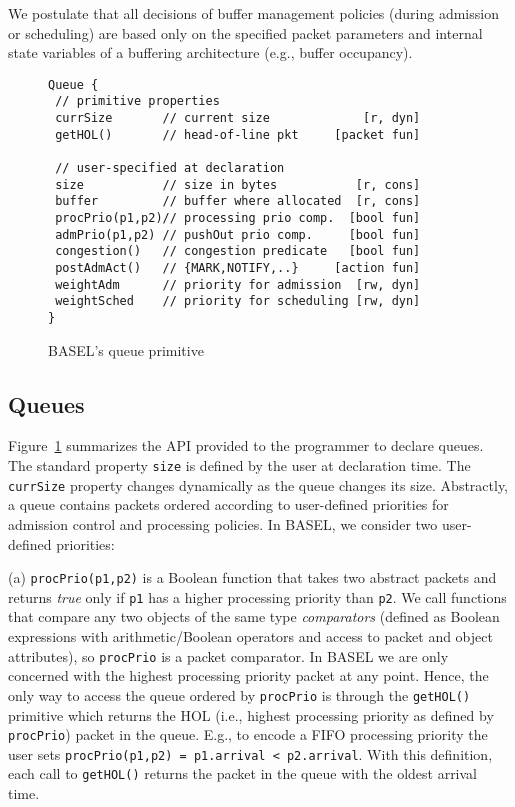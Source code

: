 \documentclass{article}
\newcommand{\barch}{BASEL}
\begin{document}
We postulate that all decisions of buffer management policies (during admission or scheduling) are based only on the
specified packet parameters and internal state variables of a buffering architecture (e.g., buffer occupancy).

\begin{figure}[t!]
\centering
  \begin{minipage}{1.04\linewidth}
\begin{lstlisting}[frame=tb,basicstyle=\ttfamily\small,belowskip=0em]
Queue {
 // primitive properties
 currSize       // current size             [r, dyn]
 getHOL()       // head-of-line pkt     [packet fun]

 // user-specified at declaration
 size           // size in bytes           [r, cons]
 buffer         // buffer where allocated  [r, cons] 
 procPrio(p1,p2)// processing prio comp.  [bool fun]
 admPrio(p1,p2) // pushOut prio comp.     [bool fun]
 congestion()   // congestion predicate   [bool fun]
 postAdmAct()   // {MARK,NOTIFY,..}     [action fun]
 weightAdm      // priority for admission  [rw, dyn]
 weightSched    // priority for scheduling [rw, dyn]
}
\end{lstlisting}
    \caption{\barch{}'s queue primitive\label{list:queue}}
  \end{minipage}
  \end{figure}

\subsection{Queues}

Figure~\ref{list:queue} summarizes the API provided to the programmer to declare queues.  The standard property \lstinline|size| is defined by the user at declaration time.
The \lstinline|currSize| property changes dynamically as the queue changes its size.  
Abstractly, a queue contains packets ordered according to user-defined priorities for admission control 
and processing policies. In \barch{}, we consider two user-defined priorities:


(a)
\lstinline|procPrio(p1,p2)| is a Boolean function that takes
  two abstract packets and returns \emph{true} only if
  \lstinline|p1| has a higher processing priority than \lstinline|p2|. We call functions that compare any two
  objects of the same type \emph{comparators} (defined as Boolean expressions with arithmetic/Boolean operators
  and access to packet and object attributes),
so \lstinline|procPrio| is a packet comparator. In \barch{} we are only concerned with the highest processing priority packet at any point. Hence, the only way to access the queue ordered by \lstinline|procPrio| is through the \lstinline|getHOL()| primitive which returns the HOL (i.e., highest processing priority as defined by \lstinline|procPrio|) packet in the queue. E.g., 
to encode a FIFO processing priority the user sets
\lstinline[basicstyle=\ttfamily\small]|procPrio(p1,p2) = p1.arrival < p2.arrival|. \newline
With this definition, each call to \lstinline|getHOL()| returns the packet in the queue with the oldest arrival time.
\end{document}
